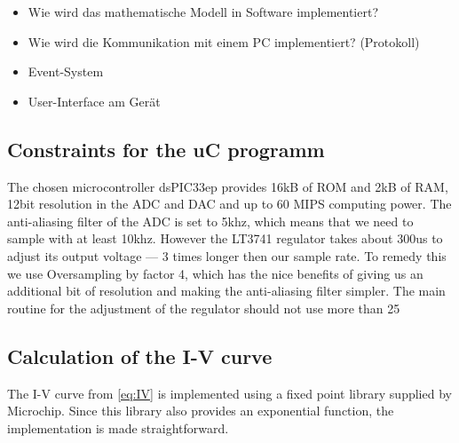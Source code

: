 \begin{itemize}
    \item
        Wie wird das mathematische Modell in Software implementiert?
    \item
        Wie wird die Kommunikation mit einem PC implementiert? (Protokoll)
    \item
        Event-System
    \item
        User-Interface am Ger\"at
\end{itemize}

\subsection{Constraints for the uC programm}
The chosen microcontroller dsPIC33ep provides 16kB of ROM and 2kB of RAM, 12bit resolution in the ADC and DAC and up to 60 MIPS computing power. The anti-aliasing filter of the ADC is set to 5khz, which means that we need to sample with at least 10khz. However the LT3741 regulator takes about 300us to adjust its output voltage --- 3 times longer then our sample rate. To remedy this we use Oversampling by factor 4, which has the nice benefits of giving us an additional bit of resolution and making the anti-aliasing filter simpler. The main routine for the adjustment of the regulator should not use more than 25%

\subsection{Calculation of the I-V curve}
The I-V curve from \eqref{eq:IV} is implemented using a fixed point library supplied by Microchip. Since this library also provides an exponential function, the implementation is made straightforward. 

